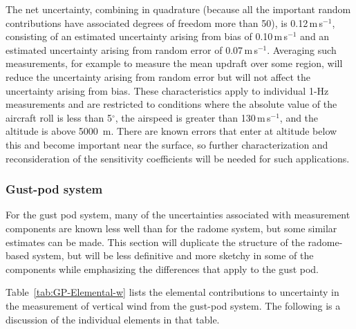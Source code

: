 \documentclass[12pt,twoside,english]{article}\usepackage[]{graphicx}\usepackage[]{color}
\let\OrgIndex\index
\renewcommand*{\index}[1]{\OrgIndex{#1}}
\begin{document}
{{{\begin{minipage}[t]{.95\textwidth}
The net uncertainty, combining in quadrature (because all the important random contributions have associated degrees of freedom more than 50), is 0.12\,m\,s$^{-1}$, consisting of an estimated uncertainty arising from bias of 0.10\,m\,s$^{-1}$ and an estimated uncertainty arising from random error of 0.07\,m\,s$^{-1}$. Averaging such measurements, for example to measure the mean updraft over some region, will reduce the uncertainty arising from random error but will not affect the uncertainty arising from bias. These characteristics apply to individual 1-Hz measurements and are restricted to conditions where the absolute value of the aircraft roll is less than 5$^{\circ}$, the airspeed is greater than 130\,m\,s$^{-1}$, and the altitude is above 5000~m. There are known errors that enter at altitude below this and become important near the surface, so further characterization and reconsideration of the sensitivity coefficients will be needed for such applications.
\end{minipage}}


\subsubsection{Gust-pod system}

For the gust pod system, many of the uncertainties associated with measurement components are known less well than for the radome system, but some similar estimates can be made. This section will duplicate the structure of the radome-based system, but will be less definitive and more sketchy in some of the components while emphasizing the differences that apply to the gust pod. 

Table~\ref{tab:GP-Elemental-w} lists the elemental contributions to uncertainty in the measurement of vertical wind from the gust-pod system. The following is a discussion of the individual elements in that table. 

}}
\end{document}
